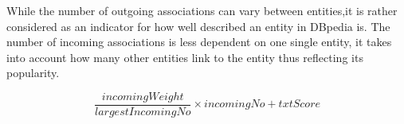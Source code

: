 \begin{table}[hb]
\centering
{}
\caption{Results of combining text search score with the number of incoming associations for query "apple"}
\label{tab:text_search_combined_incoming_associations}
\end{table}

While the number of outgoing associations can vary between entities,it is rather considered as an indicator for how well described an entity in DBpedia is. The number of incoming associations is less dependent on one single entity, it takes into account how many other entities link to the entity thus reflecting its popularity.

\begin{equation}\label{equation:equation_1}
\frac{incomingWeight}{largestIncomingNo} \times incomingNo + txtScore
\end{equation}

